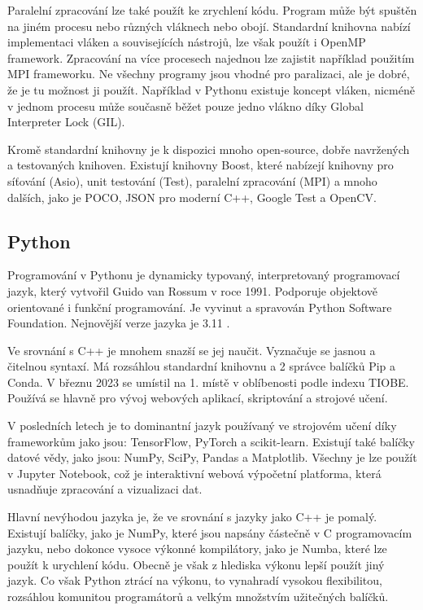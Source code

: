 Paralelní zpracování lze také použít ke zrychlení kódu.
Program může být spuštěn na jiném procesu nebo různých vláknech nebo obojí.
Standardní knihovna nabízí implementaci vláken a souvisejících nástrojů, lze však použít i OpenMP framework.
Zpracování na více procesech najednou lze zajistit například použitím MPI frameworku.
Ne všechny programy jsou vhodné pro paralizaci, ale je dobré, že je tu možnost ji použít.
Například v Pythonu existuje koncept vláken, nicméně v jednom procesu může současně běžet pouze jedno vlákno díky Global Interpreter Lock (GIL).

Kromě standardní knihovny je k dispozici mnoho open-source, dobře navržených a testovaných knihoven.
Existují knihovny Boost, které nabízejí knihovny pro síťování (Asio), unit testování (Test), paralelní zpracování (MPI) a mnoho dalších, jako je POCO, JSON pro moderní C++, Google Test a OpenCV.

\subsection{Python}
Programování v Pythonu je dynamicky typovaný, interpretovaný programovací jazyk, který vytvořil Guido van Rossum v roce 1991.
Podporuje objektově orientované i funkční programování.
Je vyvinut a spravován Python Software Foundation.
Nejnovější verze jazyka je 3.11 \cite{python}.

Ve srovnání s C++ je mnohem snazší se jej naučit.
Vyznačuje se jasnou a čitelnou syntaxí.
Má rozsáhlou standardní knihovnu a 2 správce balíčků Pip a Conda.
V březnu 2023 se umístil na 1. místě v oblíbenosti podle indexu TIOBE.
Používá se hlavně pro vývoj webových aplikací, skriptování a strojové učení.

V posledních letech je to dominantní jazyk používaný ve strojovém učení díky frameworkům jako jsou: TensorFlow, PyTorch a scikit-learn.
Existují také balíčky datové vědy, jako jsou: NumPy, SciPy, Pandas a Matplotlib.
Všechny je lze použít v Jupyter Notebook, což je interaktivní webová výpočetní platforma, která usnadňuje zpracování a vizualizaci dat.

Hlavní nevýhodou jazyka je, že ve srovnání s jazyky jako C++ je pomalý.
Existují balíčky, jako je NumPy, které jsou napsány částečně v C programovacím jazyku, nebo dokonce vysoce výkonné kompilátory, jako je Numba, které lze použít k urychlení kódu.
Obecně je však z hlediska výkonu lepší použít jiný jazyk.
Co však Python ztrácí na výkonu, to vynahradí vysokou flexibilitou, rozsáhlou komunitou programátorů a velkým množstvím užitečných balíčků.

